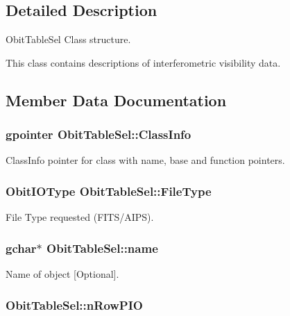 \subsection{Detailed Description}
Obit\-Table\-Sel Class structure. 

This class contains descriptions of interferometric visibility data. 



\subsection{Member Data Documentation}
\subsubsection{\setlength{\rightskip}{0pt plus 5cm}gpointer {\bf Obit\-Table\-Sel::Class\-Info}}\label{structObitTableSel_o1}


Class\-Info pointer for class with name, base and function pointers. 

\subsubsection{\setlength{\rightskip}{0pt plus 5cm}Obit\-IOType {\bf Obit\-Table\-Sel::File\-Type}}\label{structObitTableSel_o4}


File Type requested (FITS/AIPS). 

\subsubsection{\setlength{\rightskip}{0pt plus 5cm}gchar$\ast$ {\bf Obit\-Table\-Sel::name}}\label{structObitTableSel_o3}


Name of object [Optional]. 

\subsubsection{ {\bf Obit\-Table\-Sel::n\-Row\-PIO}}\label{structObitTableSel_o5}


